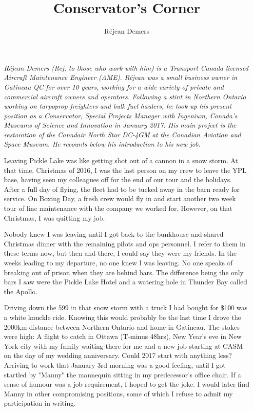 %


\title{Conservator's Corner}
\author{R\'{e}jean Demers}

\maketitle

\textit{R\'{e}jean Demers (Rej, to those who work with him) is a Transport Canada
licensed Aircraft Maintenance Engineer (AME). R\'{e}jean was a small
business owner in Gatineau QC for over 10 years, working for a wide
variety of private and commercial aircraft owners and operators.
Following a stint in Northern Ontario working on turpoprop freighters
and bulk fuel haulers, he took up his present position as a
Conservator, Special Projects Manager with Ingenium, Canada's Museums
of Science and Innovation in January 2017. His main project is the
restoration of the Canadair North Star DC-4GM at the Canadian Aviation
and Space Museum. He recounts below his introduction to his new job.}

Leaving Pickle Lake was like getting shot out of a cannon in a snow
storm. At that time, Christmas of 2016, I was the last person on my
crew to leave the YPL base, having seen my colleagues off for the end
of our tour and the holidays. After a full day of flying, the fleet had
to be tucked away in the barn ready for service. On Boxing Day, a fresh
crew would fly in and start another two week tour of line maintenance
with the company we worked for. However, on that Christmas, I was
quitting my job.

Nobody knew I was leaving until I got back to the bunkhouse and shared
Christmas dinner with the remaining pilots and ops personnel. I refer
to them in these terms now, but then and there, I could say they were
my friends. In the weeks leading to my departure, no one knew I was
leaving. No one speaks of breaking out of prison when they are behind
bars. The difference being the only bars I saw were the Pickle Lake
Hotel and a watering hole in Thunder Bay called the Apollo.

Driving down the 599 in that snow storm with a truck I had bought for
\$100 was a white knuckle ride. Knowing this would probably be the last
time I drove the 2000km distance between Northern Ontario and home in
Gatineau. The stakes were high: A flight to catch in Ottawa (T-minus
48hrs), New Year's eve in New York city with my family waiting there
for me and a new job starting at CASM on the day of my wedding
anniversary. Could 2017 start with anything less? Arriving to work that
January 3rd morning was a good feeling, until I got startled by "Manny"
the mannequin sitting in my predecessor's office chair. If a sense of
humour was a job requirement, I hoped to get the joke. I would later
find Manny in other compromising positions, some of which I refuse to
admit my participation in writing.

